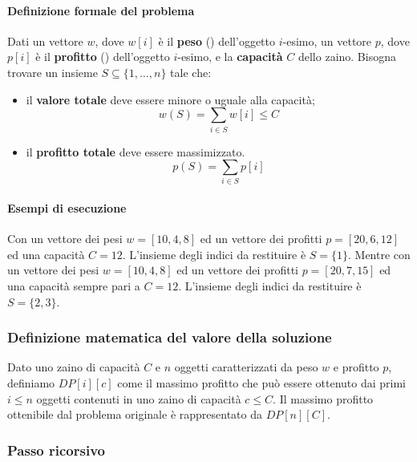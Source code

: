 \paragraph{Definizione formale del problema}
Dati un vettore \(w\), dove \(w[i]\) è il \textbf{peso} () dell'oggetto \(i\)-esimo, un vettore \(p\), dove \(p[i]\) è il \textbf{profitto} () dell'oggetto \(i\)-esimo, e la \textbf{capacità} \(C\) dello zaino.
Bisogna trovare un insieme \(S \subseteq \{1, \dots, n\}\) tale che:
\begin{itemize}
    \item il \textbf{valore totale} deve essere minore o uguale alla capacità;
    \[w(S) = \sum_{i \in S} w[i] \leqslant C\]
    \item il \textbf{profitto totale} deve essere massimizzato.
    \[p(S) = \sum_{i \in S} p[i]\]
\end{itemize}

\paragraph{Esempi di esecuzione}
Con un vettore dei pesi \(w = [10, 4, 8]\) ed un vettore dei profitti \(p = [20, 6, 12]\) ed una capacità \(C=12\).
L'insieme degli indici da restituire è \(S = \{1\}\).
Mentre con un vettore dei pesi \(w = [10, 4, 8]\) ed un vettore dei profitti \(p = [20, 7, 15]\) ed una capacità sempre pari a \(C=12\).
L'insieme degli indici da restituire è \(S = \{2, 3\}\).

\subsubsection{Definizione matematica del valore della soluzione}

Dato uno zaino di capacità \(C\) e \(n\) oggetti caratterizzati da peso \(w\) e profitto \(p\), definiamo \(DP[i][c]\) come il massimo profitto che può essere ottenuto dai primi \(i \leqslant n\) oggetti contenuti in uno zaino di capacità \(c \leqslant C\).
Il massimo profitto ottenibile dal problema originale è rappresentato da \(DP[n][C]\).

\subsubsection{Passo ricorsivo}

